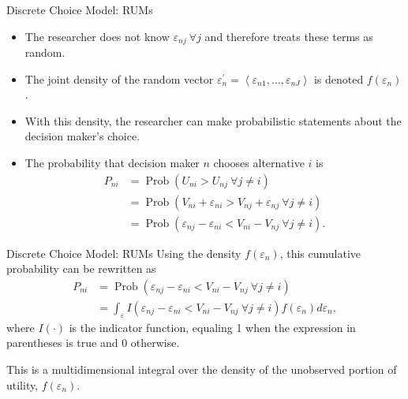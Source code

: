 \begin{frame}{Discrete Choice Model: RUMs}
\begin{itemize}
\item The researcher does not know $\varepsilon_{n j} \ \forall j$ and therefore treats these terms as random.
\item The joint density of the random vector $\varepsilon_n^{\prime}=\left\langle\varepsilon_{n 1}, \ldots, \varepsilon_{n J}\right\rangle$ is denoted $f\left(\varepsilon_n\right)$.
\item With this density, the researcher can make probabilistic statements about the decision maker's choice.
\item The probability that decision maker $n$ chooses alternative $i$ is
$$
\begin{aligned}
P_{n i} & =\operatorname{Prob}\left(U_{n i}>U_{n j} \ \forall j \neq i\right) \\
& =\operatorname{Prob}\left(V_{n i}+\varepsilon_{n i}>V_{n j}+\varepsilon_{n j} \ \forall j \neq i\right) \\
& =\operatorname{Prob}\left(\varepsilon_{n j}-\varepsilon_{n i}<V_{n i}-V_{n j} \ \forall j \neq i\right) .
\end{aligned}
$$
\end{itemize}
\end{frame}



\begin{frame}{Discrete Choice Model: RUMs}
Using the density $f\left(\varepsilon_n\right)$, this cumulative probability can be rewritten as
$$
\begin{aligned}
P_{n i} & =\operatorname{Prob}\left(\varepsilon_{n j}-\varepsilon_{n i}<V_{n i}-V_{n j} \ \forall j \neq i\right) \\
& =\int_{\varepsilon} I\left(\varepsilon_{n j}-\varepsilon_{n i}<V_{n i}-V_{n j} \ \forall j \neq i\right) f\left(\varepsilon_n\right) d \varepsilon_n,
\end{aligned}
$$
where $I(\cdot)$ is the indicator function, equaling 1 when the expression in parentheses is true and 0 otherwise.

\hspace*{\fill}

This is a multidimensional integral over the density of the unobserved portion of utility, $f\left(\varepsilon_n\right)$.
\end{frame}




